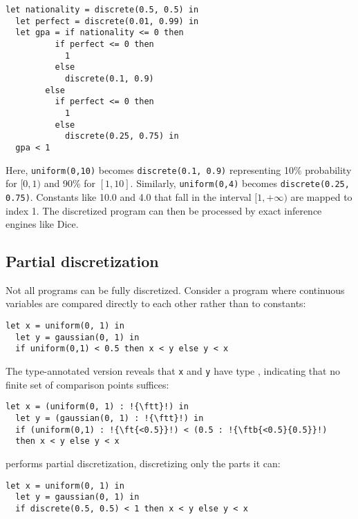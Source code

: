 \begin{lstlisting}[aboveskip=1em,belowskip=1em]
  let nationality = discrete(0.5, 0.5) in
  let perfect = discrete(0.01, 0.99) in
  let gpa = if nationality <= 0 then
          if perfect <= 0 then
            1
          else
            discrete(0.1, 0.9)
        else
          if perfect <= 0 then
            1
          else
            discrete(0.25, 0.75) in
  gpa < 1
\end{lstlisting}

\noindent Here, \texttt{uniform(0,10)} becomes \texttt{discrete(0.1, 0.9)} representing 10\% probability for $[0,1)$ and 90\% for $[1,10]$. Similarly, \texttt{uniform(0,4)} becomes \texttt{discrete(0.25, 0.75)}. Constants like 10.0 and 4.0 that fall in the interval $[1,+\infty)$ are mapped to index 1. The discretized program can then be processed by exact inference engines like Dice.

\subsection{Partial discretization}

Not all programs can be fully discretized. Consider a program where continuous variables are compared directly to each other rather than to constants:

\begin{lstlisting}[aboveskip=1em,belowskip=1em,escapechar=!]
  let x = uniform(0, 1) in
  let y = gaussian(0, 1) in
  if uniform(0,1) < 0.5 then x < y else y < x
\end{lstlisting}

\noindent The type-annotated version reveals that \texttt{x} and \texttt{y} have type \ftt, indicating that no finite set of comparison points suffices:

\begin{lstlisting}[aboveskip=1em,belowskip=1em,escapechar=!]
  let x = (uniform(0, 1) : !{\ftt}!) in
  let y = (gaussian(0, 1) : !{\ftt}!) in
  if (uniform(0,1) : !{\ft{<0.5}}!) < (0.5 : !{\ftb{<0.5}{0.5}}!) 
  then x < y else y < x
\end{lstlisting}

\noindent \Slice{} performs partial discretization, discretizing only the parts it can:

\begin{lstlisting}[aboveskip=1em,belowskip=1em]
  let x = uniform(0, 1) in
  let y = gaussian(0, 1) in
  if discrete(0.5, 0.5) < 1 then x < y else y < x
\end{lstlisting}


